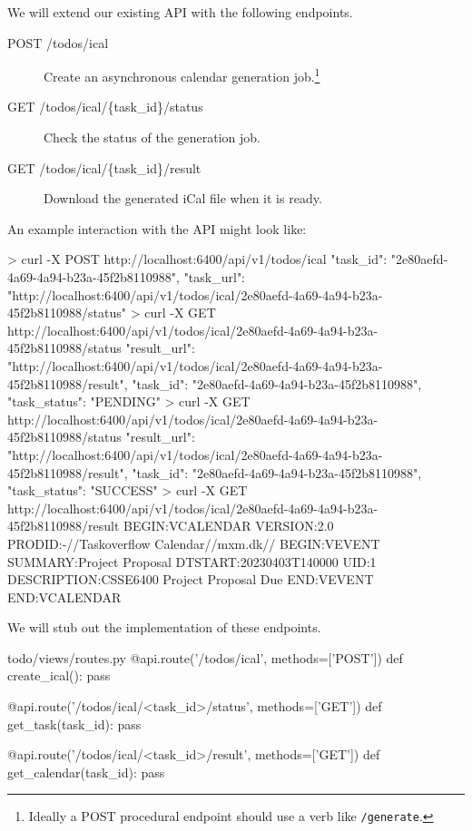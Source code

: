 \documentclass{csse4400}
\begin{document}
We will extend our existing API with the following endpoints.

\begin{description}
    \item[POST /todos/ical] Create an asynchronous calendar generation job.\footnote{Ideally a POST procedural endpoint should use a verb like \texttt{/generate}.}
    \item[GET /todos/ical/\{task\_id\}/status] Check the status of the generation job.
    \item[GET /todos/ical/\{task\_id\}/result] Download the generated iCal file when it is ready.
\end{description}

An example interaction with the API might look like:

\begin{code}[language=bash,numbers=none]{}
> curl -X POST http://localhost:6400/api/v1/todos/ical
{
  "task_id": "2e80aefd-4a69-4a94-b23a-45f2b8110988",
  "task_url": "http://localhost:6400/api/v1/todos/ical/2e80aefd-4a69-4a94-b23a-45f2b8110988/status"
}
> curl -X GET http://localhost:6400/api/v1/todos/ical/2e80aefd-4a69-4a94-b23a-45f2b8110988/status
{
  "result_url": "http://localhost:6400/api/v1/todos/ical/2e80aefd-4a69-4a94-b23a-45f2b8110988/result",
  "task_id": "2e80aefd-4a69-4a94-b23a-45f2b8110988",
  "task_status": "PENDING"
}
> curl -X GET http://localhost:6400/api/v1/todos/ical/2e80aefd-4a69-4a94-b23a-45f2b8110988/status
{
  "result_url": "http://localhost:6400/api/v1/todos/ical/2e80aefd-4a69-4a94-b23a-45f2b8110988/result",
  "task_id": "2e80aefd-4a69-4a94-b23a-45f2b8110988",
  "task_status": "SUCCESS"
}
> curl -X GET http://localhost:6400/api/v1/todos/ical/2e80aefd-4a69-4a94-b23a-45f2b8110988/result
BEGIN:VCALENDAR
VERSION:2.0
PRODID:-//Taskoverflow Calendar//mxm.dk//
BEGIN:VEVENT
SUMMARY:Project Proposal
DTSTART:20230403T140000
UID:1
DESCRIPTION:CSSE6400 Project Proposal Due
END:VEVENT
END:VCALENDAR
\end{code}

We will stub out the implementation of these endpoints.

\begin{code}[language=python,numbers=none]{todo/views/routes.py}
@api.route('/todos/ical', methods=['POST'])
def create_ical():
    pass

@api.route('/todos/ical/<task_id>/status', methods=['GET'])
def get_task(task_id):
    pass

@api.route('/todos/ical/<task_id>/result', methods=['GET'])
def get_calendar(task_id):
    pass
\end{code}
\end{document}
